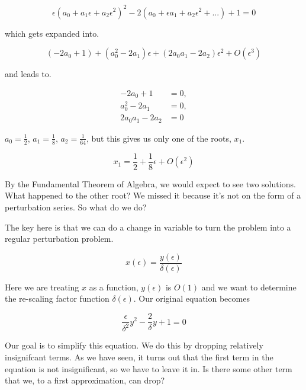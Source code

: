 \documentclass[12pt]{article}
\begin{document}
\begin{equation}
\epsilon (a_0 + a_1 \epsilon + a_2 \epsilon^2)^2 - 2(a_0 + \epsilon a_1 +
a_2 \epsilon^2 + ...) + 1 = 0
\end{equation}

which gets expanded into.

\begin{equation}
(- 2 a_0 + 1) + (a_0^2 - 2 a_1) \epsilon + (2 a_0 a_1 -2 a_2) \epsilon^2 +
O(\epsilon^3)
\end{equation}

and leads to.

\begin{align}
- 2 a_0 + 1 &= 0, \\
a_0^2 - 2 a_1 &= 0, \\
2 a_0 a_1 -2 a_2 &= 0
\end{align}

$a_0 = \frac{1}{2}$, $a_1=\frac{1}{8}$, $a_2= \frac{1}{64}$, but this gives us
only one of the roots, $x_1$.

\begin{equation}
x_1 = \frac{1}{2} + \frac{1}{8} \epsilon + O(\epsilon^2)
\end{equation}

By the Fundamental Theorem of Algebra, we would expect to see two solutions.
What happened to the other root? We missed it because it's not on the form of
a perturbation series. So what do we do?

The key here is that we can do a change in variable to turn the problem into a
regular perturbation problem.

\begin{equation}
x(\epsilon) = \frac{y(\epsilon)}{\delta(\epsilon)}
\end{equation}

Here we are treating $x$ as a function, $y(\epsilon)$ is $O(1)$ and we want to
determine the re-scaling factor function $\delta(\epsilon)$. Our original
equation becomes

\begin{equation}
\frac{\epsilon}{\delta^2} y^2 - \frac{2}{\delta} y + 1 = 0
\end{equation}

Our goal is to simplify this equation. We do this by dropping relatively
insignifcant terms. As we have seen, it turns out that the first term in the
equation is not insignificant, so we have to leave it in. Is there some other
term that we, to a first approximation, can drop?
\end{document}

